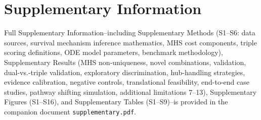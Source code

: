 \documentclass[times, twoside, watermark]{zHenriquesLab-StyleBioRxiv}
\begin{document}
\section*{Supplementary Information}
Full Supplementary Information--including Supplementary Methods (S1--S6: data sources, survival mechanism inference mathematics, MHS cost components, triple scoring definitions, ODE model parameters, benchmark methodology), Supplementary Results (MHS non-uniqueness, novel combinations, validation, dual-vs.-triple validation, exploratory discrimination, hub-handling strategies, evidence calibration, negative controls, translational feasibility, end-to-end case studies, pathway shifting simulation, additional limitations 7--13), Supplementary Figures (S1--S16), and Supplementary Tables (S1--S9)--is provided in the companion document \texttt{supplementary.pdf}.
\end{document}
